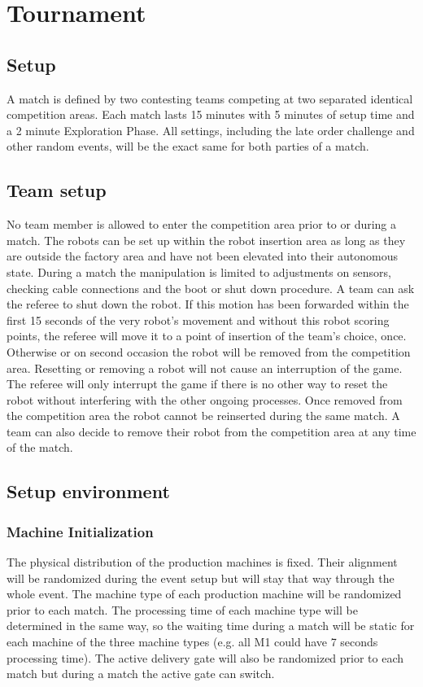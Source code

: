\documentclass[12pt,twoside]{article}
\begin{document}
\section{Tournament}
\subsection{Setup}

A match is defined by two contesting teams competing at two separated
identical competition areas. Each match lasts 15 minutes with 5
minutes of setup time and a 2 minute Exploration Phase. All settings,
including the late order challenge and other random events, will be
the exact same for both parties of a match.

\subsection{Team setup}
\label{sec:team-setup}
No team member is allowed to enter the competition area prior to or
during a match. The robots can be set up within the robot insertion
area as long as they are outside the factory area and have not been
elevated into their autonomous state. During a match the manipulation
is limited to adjustments on sensors, checking cable connections and
the boot or shut down procedure. A team can ask the referee to shut
down the robot. If this motion has been forwarded within the first 15
seconds of the very robot's movement and without this robot scoring
points, the referee will move it to a point of insertion of the team's
choice, once. Otherwise or on second occasion the robot will be
removed from the competition area. Resetting or removing a robot will
not cause an interruption of the game. The referee will only interrupt
the game if there is no other way to reset the robot without
interfering with the other ongoing processes. Once removed from the
competition area the robot cannot be reinserted during the same match.
A team can also decide to remove their robot from the competition area
at any time of the match.

\subsection{Setup environment}
\subsubsection{Machine Initialization}

The physical distribution of the production machines is fixed. Their
alignment will be randomized during the event setup but will stay that
way through the whole event. The machine type of each production
machine will be randomized prior to each match. The processing time of
each machine type will be determined in the same way, so the waiting
time during a match will be static for each machine of the three
machine types (e.g. all M1 could have 7 seconds processing time). The
active delivery gate will also be randomized prior to each match but
during a match the active gate can switch.
\end{document}

